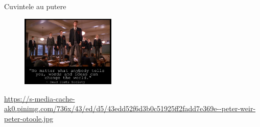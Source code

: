 \documentclass{beamer}
\begin{document}
\begin{frame}{Cuvintele au putere}
  \begin{figure}
    \centering
    \includegraphics[width=0.4\textwidth]{img/dead-poets-society-words-change}
  \end{figure}
  \begin{center}
    \tiny
    \url{https://s-media-cache-ak0.pinimg.com/736x/43/ed/d5/43edd52f6d3b0c51925ff2fadd7e369e--peter-weir-peter-otoole.jpg}
  \end{center}
\end{frame}
\end{document}
